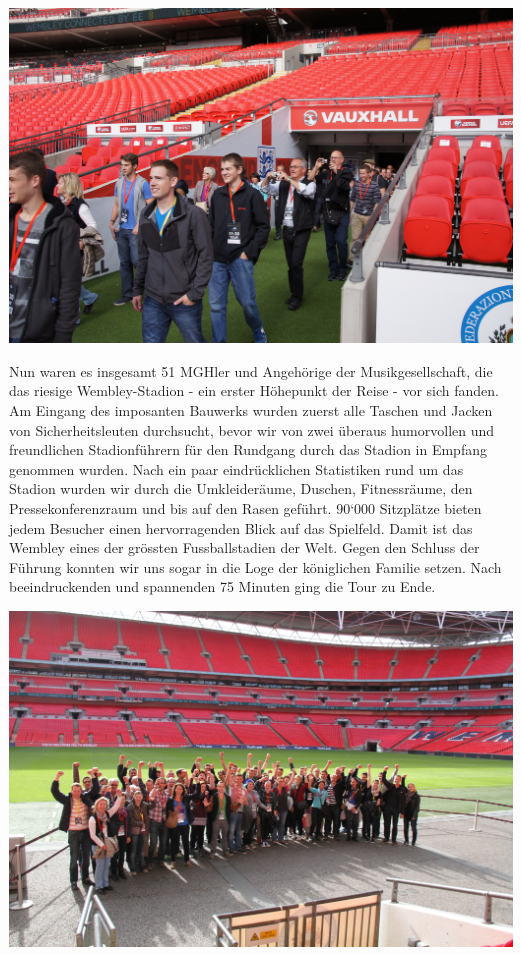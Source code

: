 \begin{history}
    \begin{MulticolFigure}
        \centering
        \includegraphics[width=0.93\linewidth]{./chap/2001-2024/2014/Einmarsch-Wembley.jpg}
    \end{MulticolFigure}

    Nun waren es insgesamt 51 MGHler und Angehörige der Musikgesellschaft, die
    das riesige Wembley-Stadion - ein erster Höhepunkt der Reise - vor sich
    fanden. Am Eingang des imposanten Bauwerks wurden zuerst alle Taschen und
    Jacken von Sicherheitsleuten durchsucht, bevor wir von zwei überaus
    humorvollen und freundlichen Stadionführern für den Rundgang durch das
    Stadion in Empfang genommen wurden. Nach ein paar eindrücklichen Statistiken
    rund um das Stadion wurden wir durch die Umkleideräume, Duschen,
    Fitnessräume, den Pressekonferenzraum und bis auf den Rasen geführt. 90`000
    Sitzplätze bieten jedem Besucher einen hervorragenden Blick auf das
    Spielfeld. Damit ist das Wembley eines der grössten Fussballstadien der
    Welt. Gegen den Schluss der Führung konnten wir uns sogar in die Loge der
    königlichen Familie setzen. Nach beeindruckenden und spannenden 75 Minuten
    ging die Tour zu Ende.

    \begin{MulticolFigure}
        \centering
        \includegraphics[width=0.93\linewidth]{./chap/2001-2024/2014/Wembley-Gruppe.jpg}
    \end{MulticolFigure}


\end{history}
